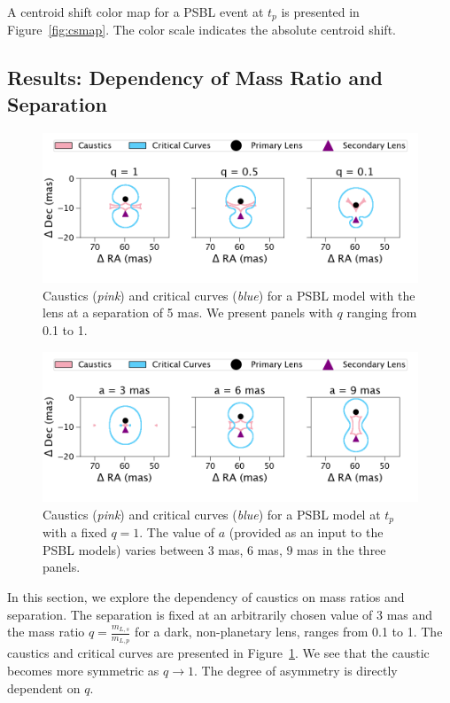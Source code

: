 \documentclass[twocolumn]{aastex701}
\begin{document}
A centroid shift color map for a PSBL event at $t_p$ is presented in Figure~\ref{fig:csmap}. The color scale indicates the absolute centroid shift.



\subsection{Results: Dependency of Mass Ratio and Separation}


\begin{figure}
    \centering
    \includegraphics[width= \textwidth]{figures/magmaps_varyq.png}
    \caption{Caustics (\emph{pink}) and critical curves (\emph{blue}) for a PSBL model with the lens at a separation of 5 mas. We present panels with $q$ ranging from 0.1 to 1.}
    \label{fig:magmaps_varyq}
\end{figure}



\begin{figure}
    \centering
    \includegraphics[width= \textwidth]{figures/magmaps_varysep.png}
    \caption{Caustics (\emph{pink}) and critical curves (\emph{blue}) for a PSBL model at $t_p$ with a fixed $q=1$. The value of $a$ (provided as an input to the PSBL models) varies between $3$ mas, $6$ mas, $9$ mas in the three panels.}
    \label{fig:magmaps_varysep}
\end{figure}

\label{sec:results_q}
In this section, we explore the dependency of caustics on mass ratios and separation. The separation is fixed at an arbitrarily chosen value of 3 mas and the mass ratio $q=\frac{m_{L,s}}{m_{L,p}}$ for a dark, non-planetary lens, ranges from 0.1 to 1. The caustics and critical curves are presented in Figure~\ref{fig:magmaps_varyq}. We see that the caustic becomes more symmetric as $q \rightarrow 1$. The degree of asymmetry is directly dependent on $q$. 
\end{document}
